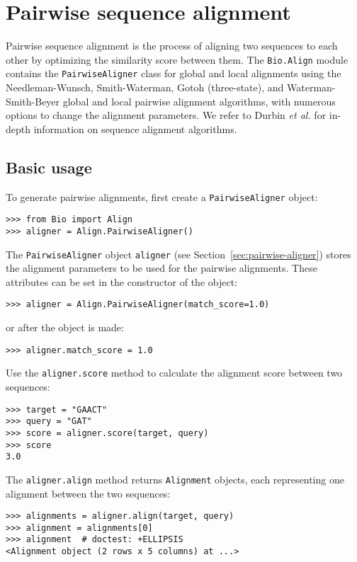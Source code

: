 \chapter{Pairwise sequence alignment}
\label{chapter:pairwise}

Pairwise sequence alignment is the process of aligning two sequences to each
other by optimizing the similarity score between them.  The \verb|Bio.Align|
module contains the \verb|PairwiseAligner| class for global and local
alignments using the Needleman-Wunsch, Smith-Waterman, Gotoh (three-state), and
Waterman-Smith-Beyer global and local pairwise alignment algorithms, with
numerous options to change the alignment parameters.
We refer to Durbin \textit{et al.} \cite{durbin1998} for in-depth information on sequence alignment algorithms.

\section{Basic usage}
\label{sec:pairwise-basic}

To generate pairwise alignments, first create a \verb+PairwiseAligner+ object:

\begin{verbatim}
>>> from Bio import Align
>>> aligner = Align.PairwiseAligner()
\end{verbatim}
The \verb+PairwiseAligner+ object \verb+aligner+
(see Section~\ref{sec:pairwise-aligner})
stores the alignment parameters to be used for the pairwise alignments.
These attributes can be set in the constructor of the object:
\begin{verbatim}
>>> aligner = Align.PairwiseAligner(match_score=1.0)
\end{verbatim}
or after the object is made:
\begin{verbatim}
>>> aligner.match_score = 1.0
\end{verbatim}

Use the \verb+aligner.score+ method to calculate the alignment score between
two sequences:

\begin{verbatim}
>>> target = "GAACT"
>>> query = "GAT"
>>> score = aligner.score(target, query)
>>> score
3.0
\end{verbatim}

The \verb+aligner.align+ method returns \verb+Alignment+ objects, each representing one alignment between the two sequences:
\begin{verbatim}
>>> alignments = aligner.align(target, query)
>>> alignment = alignments[0]
>>> alignment  # doctest: +ELLIPSIS
<Alignment object (2 rows x 5 columns) at ...>
\end{verbatim}

